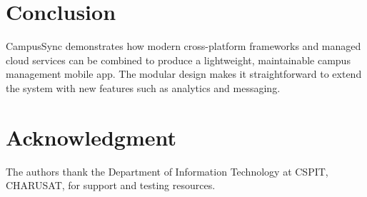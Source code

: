 \documentclass[conference]{IEEEtran}
\begin{document}
\section{Conclusion}
CampusSync demonstrates how modern cross-platform frameworks and managed cloud services can be combined to produce a lightweight, maintainable campus management mobile app. The modular design makes it straightforward to extend the system with new features such as analytics and messaging.

\section*{Acknowledgment}
The authors thank the Department of Information Technology at CSPIT, CHARUSAT, for support and testing resources.



\end{document}
